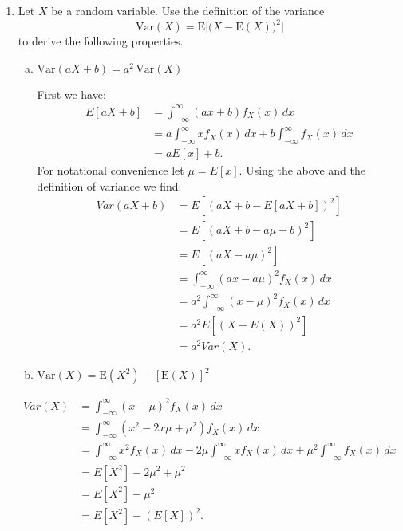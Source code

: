 \documentclass[letterpaper,12pt,fleqn]{article}
\begin{document}
\begin{enumerate}
\vspace{2em}

\item Let $X$ be a random variable.  Use the definition of the variance
\begin{equation*}
\mbox{Var}(X) = \mbox{E} \big[ \big( X - \mbox{E}(X) \big)^{2} \big]
\end{equation*}
to derive the following properties.

\vspace{0.5em}

\begin{enumerate}[(a)]
\item $\mbox{Var}(aX + b) = a^{2} \, \mbox{Var}(X)$

First we have:
\begin{align*}
E[aX+b] &= \int_{-\infty}^{\infty} (ax+b)f_X(x)\,dx \\ &= a\int_{-\infty}^{\infty}xf_X(x) \,dx + b\int_{-\infty}^{\infty} f_X(x)\,dx \\ &= aE[x] + b.
\end{align*}
For notational convenience let $\mu = E[x]$. Using the above and the definition of variance we find:
\begin{align*}
Var(aX + b) &= E[(aX+b - E[aX+b])^2] \\
&= E[(aX+b - a\mu - b)^2] \\
&= E[(aX - a\mu)^2] \\
&= \int_{-\infty}^{\infty} (ax-a\mu)^2 f_X(x) \, dx \\
&= a^2\int_{-\infty}^{\infty} (x-\mu)^2 f_X(x) \, dx \\
&= a^2E[(X-E(X))^2] \\
&= a^2Var(X).
\end{align*}

\item $\mbox{Var}(X) = \mbox{E}(X^{2}) - [\mbox{E}(X)]^{2}$
\end{enumerate}

\begin{align*}
Var(X) &= \int_{-\infty}^{\infty} (x-\mu)^2f_X(x) \,dx \\
&= \int_{-\infty}^{\infty} (x^2 - 2x\mu + \mu^2)f_X(x) \,dx\\
&= \int_{-\infty}^{\infty} x^2f_X(x)\,dx -2\mu\int_{-\infty}^{\infty} xf_X(x) \,dx + \mu^2\int_{-\infty}^{\infty} f_X(x) \, dx \\
&= E[X^2] - 2\mu^2 + \mu^2 \\
&= E[X^2] - \mu^2 \\
&= E[X^2] - (E[X])^2.
\end{align*}


\end{enumerate}
\end{document}

